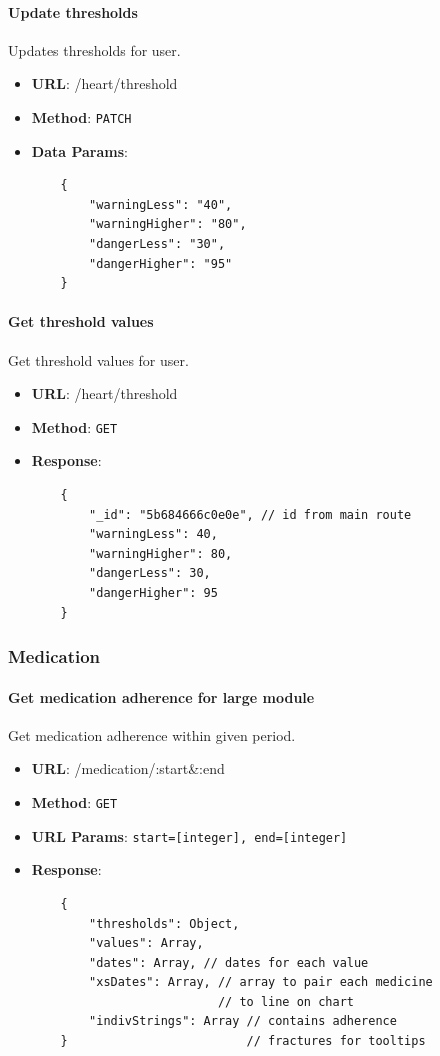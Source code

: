         \paragraph{Update thresholds} Updates thresholds for user.
        \begin{itemize}
            \item \textbf{URL}: /heart/threshold
            \item \textbf{Method}: \texttt{PATCH}
            \item \textbf{Data Params}: \begin{verbatim}
    {
        "warningLess": "40",
        "warningHigher": "80",
        "dangerLess": "30",
        "dangerHigher": "95"
    }  
            \end{verbatim}
        \end{itemize}

        \paragraph{Get threshold values} Get threshold values for user.
        \begin{itemize}
            \item \textbf{URL}: /heart/threshold
            \item \textbf{Method}: \texttt{GET}
            \item \textbf{Response}: \begin{verbatim}
    {
        "_id": "5b684666c0e0e", // id from main route
        "warningLess": 40,
        "warningHigher": 80,
        "dangerLess": 30,
        "dangerHigher": 95
    }
            \end{verbatim}
        \end{itemize}

    \subsubsection{Medication}

        \paragraph{Get medication adherence for large module} Get medication adherence within given period.
        \begin{itemize}
            \item \textbf{URL}: /medication/:start\&:end
            \item \textbf{Method}: \texttt{GET}
            \item \textbf{URL Params}: \texttt{start=[integer], end=[integer]}
            \item \textbf{Response}: \begin{verbatim}
    {
        "thresholds": Object,
        "values": Array,
        "dates": Array, // dates for each value
        "xsDates": Array, // array to pair each medicine
                          // to line on chart
        "indivStrings": Array // contains adherence 
    }                         // fractures for tooltips
            \end{verbatim}
        \end{itemize}

